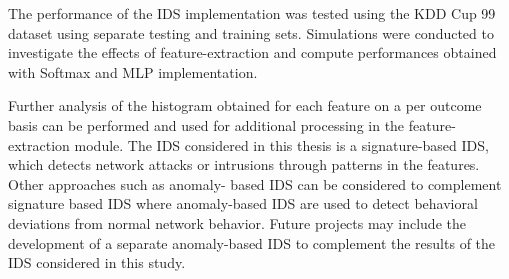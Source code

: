 \documentclass[12pt]{article}
\theoremstyle{definition}
\begin{document}
	The performance of the IDS implementation was tested using the KDD Cup 99 dataset using separate testing and training sets. Simulations were conducted to investigate the effects of feature-extraction and compute performances obtained with Softmax and MLP implementation.
	
	Further analysis of the histogram obtained for each feature on a per outcome basis can be performed and used for additional processing in the feature-extraction module.
	The IDS considered in this thesis is a signature-based IDS, which detects network attacks or intrusions through patterns in the features. Other approaches such as anomaly-
	based IDS can be considered to complement signature based IDS where anomaly-based IDS are used to detect behavioral deviations from normal network behavior. Future projects may include the development of a separate anomaly-based IDS
	to complement the results of the IDS considered in this study.
	
	
	\cleardoublepage
	
	
		
	
	
	
	
	
	
	
	
	
	
	
	
	
	
	
	
	
	
	
	
	
\end{document}
